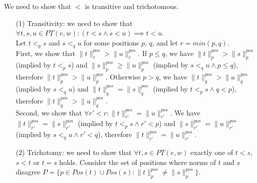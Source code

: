 \documentclass[AMA,STIX1COL]{WileyNJD-v2}
\newcommand{\pnorm}[2]{\|{#1}\|^{pos}_{#2}}
\begin{document}
\begin{proofEnd}
    We need to show that $<$ is transitive and trichotomous.

    \begin{itemize}[itemsep=0.5em]
        \item[(1)]
            Transitivity: we need to show that $\forall t, s, u \in PT(e,w): (t < s \wedge s < u) \implies t < u$.
            \\[0.5em]
            Let $t <_p s$ and $s <_q u$ for some positions $p$, $q$, and let $r = min (p, q)$.
            \\[0.5em]
            First, we show that $\pnorm{t}{r} > \pnorm{u}{r}$.
            If $p \leq q$, we have $\pnorm{t}{p} > \pnorm{s}{p}$ (implied by $t <_p s$)
            and $\pnorm{s}{p} \geq \pnorm{u}{p}$ (implied by $s <_q u \wedge p \leq q$),
            therefore $\pnorm{t}{p} > \pnorm{u}{p}$.
            Otherwise $p > q$, we have $\pnorm{t}{q} > \pnorm{u}{q}$ (implied by $s <_q u$)
            and $\pnorm{t}{q} = \pnorm{s}{q}$ (implied by $t <_p s \wedge q < p$),
            therefore $\pnorm{t}{q} > \pnorm{u}{q}$.
            \\[0.5em]
            Second, we show that $\forall r' < r : \pnorm{t}{r'} = \pnorm{u}{r'}$.
            We have $\pnorm{t}{r'} = \pnorm{s}{r'}$ (implied by $t <_p s \wedge r' < p$)
            and $\pnorm{s}{r'} = \pnorm{u}{r'}$ (implied by $s <_q u \wedge r' < q$),
            therefore $\pnorm{t}{r'} = \pnorm{u}{r'}$.

        \item[(2)]
            Trichotomy: we need to show that $\forall t, s \in PT(e,w)$
            exactly one of $t < s$, $s < t$ or $t = s$ holds.
            Consider the set of positions where norms of $t$ and $s$ disagree
            $P = \{p \in Pos(t) \cup Pos(s) : \pnorm{t}{p} \neq \pnorm{s}{p}\}$.


\end{itemize}
\end{proofEnd}
\end{document}
